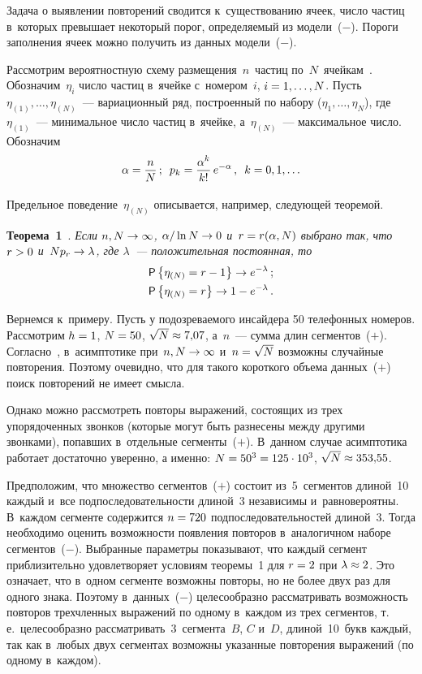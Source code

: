 \begin{multicols}{2}
  Задача о выявлении повторений сводится к~существованию ячеек, число частиц 
в~которых превышает некоторый порог,  определяемый из модели~($-$). 
Пороги заполнения ячеек можно получить из данных модели~($-$). 
  
  Рассмотрим вероятностную схему размещения~$n$~частиц 
по~$N$~ячейкам~\cite{13-gr}. Обозначим~$\eta_i$ число частиц в~ячейке с~номером~$i$, 
$i\hm=1,\ldots , N$. Пусть $\eta_{(1)},\ldots, \eta_{(N)}$~--- вариационный ряд, 
построенный по набору ($\eta_1,\ldots, \eta_N$), где $\eta_{(1)}$~--- минимальное 
чис\-ло частиц в~ячейке, а~$\eta_{(N)}$~--- максимальное чис\-ло. Обозначим 
  $$
  \alpha=\displaystyle\frac{\displaystyle n\mathstrut}{\displaystyle N\mathstrut}\,;\enskip p_k=\displaystyle\frac{\displaystyle \alpha^k\mathstrut}{\displaystyle k!\mathstrut}\,e^{-\alpha}\,,\enskip k=0, 1,\ldots
  $$
  
  Предельное поведение~$\eta_{(N)}$ описывается, например, следующей 
теоремой.
  
\smallskip
  
  \noindent
  \textbf{Теорема~1}~\cite{13-gr}. \textit{Если $n,N\hm\to \infty$, $\alpha/\ln N 
\hm\to 0$ и~$r\hm= r(\alpha,N)$ выбрано так, что $r\hm>0$ и~$N p_r\hm\to 
\lambda$, где $\lambda$~--- положительная постоянная, то} 
 \begin{gather*}
  {\sf P}\left\{ \eta_{(N)} =r-1\right\}\to e^{-\lambda}\,;\\
  {\sf P}\left\{ \eta_{(N)} = 
r\right\} \to 1-e^{-\lambda}\,.
\end{gather*}
  
  
  Вернемся к~примеру. Пусть у подозреваемого инсайдера 50 телефонных 
номеров. Рассмотрим $h\hm = 1$, $N \hm= 50$, $\sqrt{N}\hm\approx 7{,}07$, 
а~$n$~--- сумма длин сегментов~($+$). Согласно~\cite{13-gr}, в~асимптотике 
при~$n, N\hm\to \infty$ и~$n\hm=\sqrt{N}$ возможны случайные повторения. 
Поэтому очевидно, что для такого короткого объема данных~($+$) поиск 
повторений не имеет смысла. 
  
  Однако можно рассмотреть повторы выражений, состоящих из трех 
упорядоченных звонков (которые могут быть разнесены между другими 
звонками), попавших в~отдельные сегменты~($+$). В~данном случае асимптотика 
работает достаточно уверенно, а именно: $N\hm=50^3\hm= 125\cdot 10^3$, 
$\sqrt{N}\hm\approx 353{,}55$. 
  
  Предположим, что множество сегментов~($+$) состоит из~5~сегментов 
длиной~10 каждый и~все подпоследовательности длиной~3 независимы 
и~равновероятны. В~каждом сегменте содержится $n\hm = 720$ 
подпоследовательностей длиной~3. Тогда необходимо оценить возможности 
появления повторов в~аналогичном наборе сегментов~($-$). Выбранные 
параметры показывают, что каждый сегмент приблизительно удовлетворяет 
условиям теоремы~1 для $r \hm=2$ при $\lambda\hm\approx2$. Это означает, что 
в~одном сегменте возможны повторы, но не более двух раз для одного знака. 
Поэтому в~данных~($-$) целесообразно рассматривать возможность повторов 
трехчленных выражений по одному в~каждом из трех сегментов, т.\,е.\ 
целесообразно рассматривать~3~сегмента~$B$, $C$ и~$D$, длиной~10~букв каждый, так 
как в~любых двух сегментах возможны указанные повторения выражений (по 
одному в~каждом). 
  

\end{multicols}
